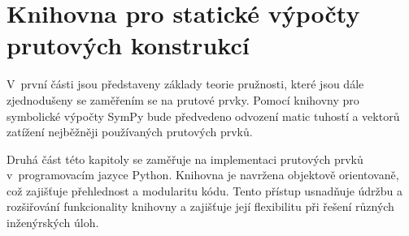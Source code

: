 \chapter{Knihovna pro statické výpočty prutových konstrukcí}

V~první části jsou představeny základy teorie pružnosti, které jsou dále zjednodušeny se zaměřením se na prutové prvky. Pomocí knihovny pro symbolické výpočty SymPy\cite{sympy} bude předvedeno odvození matic tuhostí a vektorů zatížení nejběžněji používaných prutových prvků.

Druhá část této kapitoly se zaměřuje na implementaci prutových prvků v~programovacím jazyce Python. Knihovna je navržena objektově orientovaně, což zajišťuje přehlednost a modularitu kódu. Tento přístup usnadňuje údržbu a rozšiřování funkcionality knihovny a zajišťuje její flexibilitu při řešení různých inženýrských úloh.










